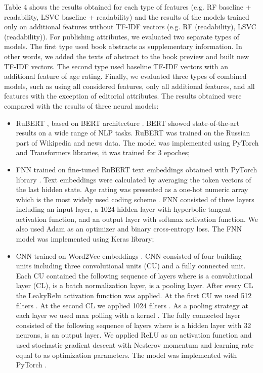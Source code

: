 \documentclass[runningheads]{llncs}
\begin{document}
Table 4 shows the results obtained for each type of features (e.g. RF baseline + readability, LSVC baseline + readability) and the results of the models trained only on additional features without TF-IDF vectors (e.g. RF (readability), LSVC (readability)). For publishing attributes, we evaluated two separate types of models. The first type used book abstracts as supplementary information. In other words, we added the texts of abstract to the book preview and built new TF-IDF vectors. The second type used baseline TF-IDF vectors with an additional feature of age rating. Finally, we evaluated three types of combined models, such as using all considered features, only all additional features, and all features with the exception of editorial attributes. The results obtained were compared with the results of three neural models:
\begin{itemize}
    \item RuBERT \cite{Kuratov}, based on BERT architecture \cite{Devlin}. BERT showed state-of-the-art results on a wide range of NLP tasks. RuBERT was trained on the Russian part of Wikipedia and news data. The model was implemented using PyTorch \cite{Paszke} and Transformers \cite{Wolf} libraries, it was trained for 3 epoches;
    \item FNN trained on fine-tuned RuBERT \cite{Kuratov} text embeddings obtained with PyTorch library \cite{Paszke}. Text embeddings were calculated by averaging the token vectors of the last hidden state. Age rating was presented as a one-hot numeric array which is the most widely used coding scheme \cite{coding}. FNN consisted of three layers including an input layer, a 1024 hidden layer with hyperbolic tangent activation function, and an output layer with softmax activation function. We also used Adam as an optimizer and binary cross-entropy loss. The FNN model was implemented using Keras \cite{Keras} library;
    \item CNN trained on Word2Vec embeddings \cite{Kutuzov}. CNN consisted of four building units including three convolutional units (CU) and a fully connected unit. Each CU contained the following sequence of layers  where  is a convolutional layer (CL),  is a batch normalization layer,  is a pooling layer. After every CL the LeakyRelu activation function was applied. At the first CU we used 512 filters . At the second CL we applied 1024 filters . As a pooling strategy at each layer we used max polling with a kernel . The fully connected layer consisted of the following sequence of layers  where  is a hidden layer with 32 neurons,  is an output layer. We applied ReLU as an activation function and used stochastic gradient descent with Nesterov momentum and learning rate equal to  as optimization parameters. The model was implemented with PyTorch \cite{Paszke}.
\end{itemize}
\end{document}
